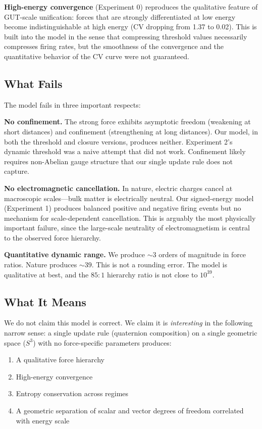 \documentclass[letterpaper,12pt]{article}
\begin{document}
\textbf{High-energy convergence} (Experiment 0) reproduces the qualitative feature of GUT-scale unification: forces that are strongly differentiated at low energy become indistinguishable at high energy (CV dropping from 1.37 to 0.02). This is built into the model in the sense that compressing threshold values necessarily compresses firing rates, but the smoothness of the convergence and the quantitative behavior of the CV curve were not guaranteed.

\subsection{What Fails}

The model fails in three important respects:

\textbf{No confinement.} The strong force exhibits asymptotic freedom (weakening at short distances) and confinement (strengthening at long distances). Our model, in both the threshold and closure versions, produces neither. Experiment 2's dynamic threshold was a naive attempt that did not work. Confinement likely requires non-Abelian gauge structure that our single update rule does not capture.

\textbf{No electromagnetic cancellation.} In nature, electric charges cancel at macroscopic scales---bulk matter is electrically neutral. Our signed-energy model (Experiment 1) produces balanced positive and negative firing events but no mechanism for scale-dependent cancellation. This is arguably the most physically important failure, since the large-scale neutrality of electromagnetism is central to the observed force hierarchy.

\textbf{Quantitative dynamic range.} We produce $\sim 3$ orders of magnitude in force ratios. Nature produces $\sim 39$. This is not a rounding error. The model is qualitative at best, and the $85{:}1$ hierarchy ratio is not close to $10^{39}$.

\subsection{What It Means}

We do not claim this model is correct. We claim it is \emph{interesting} in the following narrow sense: a single update rule (quaternion composition) on a single geometric space ($S^3$) with no force-specific parameters produces:

\begin{enumerate}
  \item A qualitative force hierarchy
  \item High-energy convergence
  \item Entropy conservation across regimes
  \item A geometric separation of scalar and vector degrees of freedom correlated with energy scale
\end{enumerate}
\end{document}
